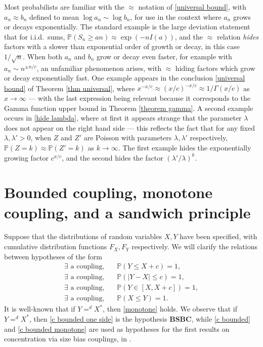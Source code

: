 \documentclass[smallextended,envcountsect]{svjour3}
\begin{document}
\begin{remark} Most probabilists are familiar with the $\approx$ notation of \eqref{universal bound},
with  $a_n \approx b_n$ defined to mean  $\log a_n \sim \log b_n$, for use in the context where $a_n$ grows or decays exponentially.  The standard example is the large deviation statement that
for i.i.d.\ sums, ${\mathbb{P}} (S_n \ge a n ) \approx \exp(-n I(a) )$, and the $\approx$ relation \emph{hides}  factors with a slower than exponential order of growth or decay, in this case $1/\sqrt{n}$.  When both $a_n$ and $b_n$ grow or decay even faster, for example with $a_n \sim n^{\pm n/c}$, an unfamiliar phenomenon arises, with $\approx$ hiding factors which grow or decay exponentially fast.  One example appears in the conclusion \eqref{universal bound} of Theorem \ref{thm universal}, where $x^{-x/c} \approx (x/c)^{-x/c} \approx 1/ \Gamma(x/c)$ as $x \to \infty$  --- with the last expression being relevant because  it corresponds to the Gamma function upper bound in Theorem \ref{theorem gamma}.  A second example occurs in
 \eqref{hide lambda}, where at first it appears strange that the parameter $\lambda$ does not appear on the right hand side  --- this reflects the fact that
for any fixed $\lambda, \lambda' >0$,  when $Z$ and $Z'$ are Poisson with parameters $\lambda, \lambda'$ respectively, ${\mathbb{P}} (Z=k) \approx {\mathbb{P}} (Z'=k)$ as $k \to \infty$.  The first example hides the exponentially growing factor  $c^{x/c}$,  and the second hides the factor $(\lambda' / \lambda)^k$.
\end{remark}

\section{Bounded coupling, monotone coupling, and a sandwich principle}\label{sect bounded}

Suppose that the distributions of random variables $X,Y$ have been specified, with cumulative distribution functions $F_X,F_Y$ respectively. We will clarify the relations
between hypotheses of the form
\begin{eqnarray}
\label{c bounded one side}  \exists \text{ a coupling},  & &  {\mathbb{P}}(Y \le X+c)=1, \\
\label{c bounded}      \exists \text{ a coupling}, & &  {\mathbb{P}}( |Y-X| \le c)=1,  \\
\label{c bounded monotone}     \exists \text{ a coupling},  & &  {\mathbb{P}}(Y \in [X,X+c])=1,  \\
\label{monotone}     \exists \text{ a coupling},   & &  {\mathbb{P}}( X \le Y)=1.
\end{eqnarray}
It is well-known that  if $Y =^d X^*$, then  \eqref{monotone} holds.   We observe that
if $Y =^d X^*$, then \eqref{c bounded one side} is the hypothesis {\bf BSBC}, while \eqref{c bounded} and \eqref{c bounded monotone} are used as 
hypotheses for the first results on 
concentration via size bias couplings, in
\cite{GhoshGold}.
\end{document}
